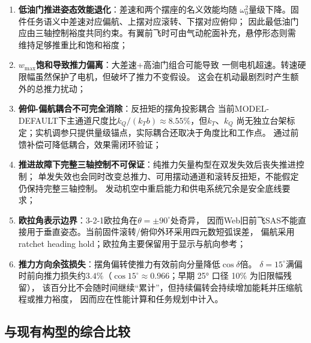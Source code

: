 \begin{enumerate}[label=(\arabic*)]
    \item \textbf{低油门推进姿态效能退化}：差速和两个摆座的名义效能均随
          $\omega_0^2$量级下降。固件任务语义中差速对应偏航、上摆对应滚转、下摆对应俯仰；
          因此最低油门应由三轴控制裕度共同约束。有翼前飞时可由气动舵面补充，悬停形态则需
          维持足够推重比和饱和裕度；
    \item \textbf{$w_{\max}$饱和导致推力偏离}：大差速+高油门组合可能导致
          一侧电机超速。转速硬限幅虽然保护了电机，但破坏了推力不变假设。
          这会在机动最剧烈时产生额外的总推力扰动；
    \item \textbf{俯仰-偏航耦合不可完全消除}：反扭矩的摆角投影耦合
          当前MODEL-DEFAULT下主通道尺度比$k_Q/(k_Tb)\approx8.55\%$，但$k_T$、$k_Q$
          尚无独立台架标定；实机调参只提供量级锚点，实际耦合还取决于角度比和工作点。
          通过前馈补偿可降低耦合，效果需闭环验证；
    \item \textbf{推进故障下完整三轴控制不可保证}：纯推力矢量构型在双发失效后丧失推进控制；
          单发失效也会同时改变总推力、可用摆动通道和滚转反扭矩，不能假定仍保持完整三轴控制。
          发动机空中重启能力和供电系统冗余是安全底线要求；
    \item \textbf{欧拉角表示边界}：3-2-1欧拉角在$\theta=\pm90^\circ$处奇异，
          因而Web旧前飞SAS不能直接用于垂直姿态。当前固件滚转/俯仰外环采用四元数短弧误差，
          偏航采用ratchet heading hold；欧拉角主要保留用于显示与航向参考\cite{markley2014fundamentals}；
    \item \textbf{推力方向余弦损失}：摆角偏转使推力有效前向分量降低$\cos\delta$倍。
          $\delta = 15^\circ$满偏时前向推力损失约$3.4\%$（$\cos 15^\circ \approx 0.966$；早期 25° 口径 10\% 为旧限幅残留），
          该百分比不会随时间继续“累计”，但持续偏转会持续增加能耗并压缩航程或推力裕度，
          因而应在性能计算和任务规划中计入。
\end{enumerate}

\subsection{与现有构型的综合比较}

